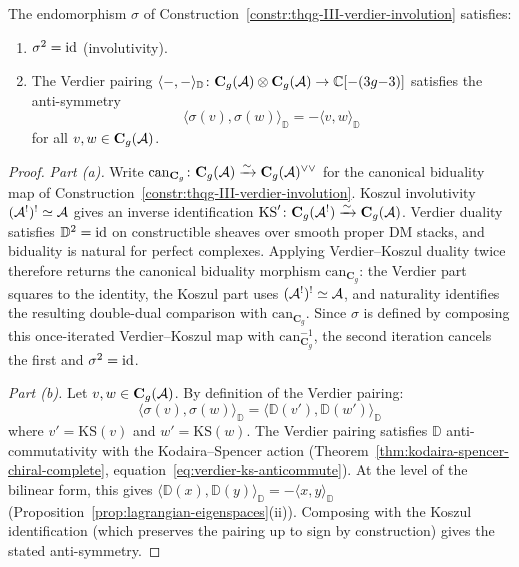 \begin{proposition}
\label{prop:thqg-III-involutivity}
The endomorphism $\sigma$ of
Construction~\textup{\ref{constr:thqg-III-verdier-involution}}
satisfies:
\begin{enumerate}[label=\textup{(\alph*)}]
\item $\sigma^2 = \mathrm{id}$ \textup{(}involutivity\textup{)}.
\item The Verdier pairing
 $\langle -, - \rangle_{\mathbb{D}} \colon
 \mathbf{C}_g(\mathcal{A}) \otimes \mathbf{C}_g(\mathcal{A}) \to
 \mathbb{C}[{-(3g{-}3)}]$
 satisfies the anti-symmetry
 \begin{equation}\label{eq:thqg-III-anti-symmetry}
 \langle \sigma(v), \sigma(w) \rangle_{\mathbb{D}}
 = -\langle v, w \rangle_{\mathbb{D}}
 \end{equation}
 for all $v, w \in \mathbf{C}_g(\mathcal{A})$.
\end{enumerate}
\end{proposition}

\begin{proof}
\emph{Part (a).}
Write
$\mathrm{can}_{\mathbf{C}_g}\colon
\mathbf{C}_g(\mathcal{A}) \xrightarrow{\sim}
\mathbf{C}_g(\mathcal{A})^{\vee\vee}$
for the canonical biduality map of
Construction~\ref{constr:thqg-III-verdier-involution}.
Koszul involutivity
$(\mathcal{A}^!)^! \simeq \mathcal{A}$ gives an inverse identification
$\mathrm{KS}'\colon \mathbf{C}_g(\mathcal{A}^!) \xrightarrow{\sim}
\mathbf{C}_g(\mathcal{A})$.
Verdier duality satisfies
$\mathbb{D}^2 = \mathrm{id}$ on constructible sheaves over
smooth proper DM stacks, and biduality is natural for perfect
complexes. Applying Verdier--Koszul duality twice therefore
returns the canonical biduality morphism
$\mathrm{can}_{\mathbf{C}_g}$: the Verdier part squares to the
identity, the Koszul part uses
$(\mathcal{A}^!)^! \simeq \mathcal{A}$, and naturality identifies the resulting
double-dual comparison with $\mathrm{can}_{\mathbf{C}_g}$.
Since $\sigma$ is defined by composing this once-iterated
Verdier--Koszul map with
$\mathrm{can}_{\mathbf{C}_g}^{-1}$, the second iteration cancels
the first and $\sigma^2 = \mathrm{id}$.

\emph{Part (b).}
Let $v, w \in \mathbf{C}_g(\mathcal{A})$. By definition of the
Verdier pairing:
\[
\langle \sigma(v), \sigma(w) \rangle_{\mathbb{D}}
= \langle \mathbb{D}(v'), \mathbb{D}(w') \rangle_{\mathbb{D}}
\]
where $v' = \mathrm{KS}(v)$ and $w' = \mathrm{KS}(w)$.
The Verdier pairing satisfies $\mathbb{D}$ anti-commutativity
with the Kodaira--Spencer action
(Theorem~\ref{thm:kodaira-spencer-chiral-complete},
equation~\eqref{eq:verdier-ks-anticommute}). At the level of
the bilinear form, this gives
$\langle \mathbb{D}(x), \mathbb{D}(y) \rangle_{\mathbb{D}}
= -\langle x, y \rangle_{\mathbb{D}}$
(Proposition~\ref{prop:lagrangian-eigenspaces}(ii)).
Composing with the Koszul identification (which preserves the
pairing up to sign by construction) gives the stated
anti-symmetry.
\end{proof}

